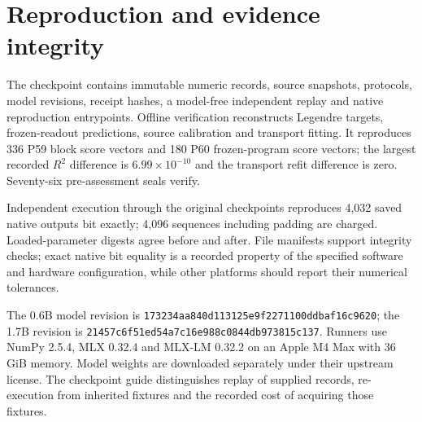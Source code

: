 \documentclass[11pt]{article}
\begin{document}
\section{Reproduction and evidence integrity}
The checkpoint contains immutable numeric records, source snapshots, protocols, model revisions, receipt hashes, a model-free independent replay and native reproduction entrypoints. Offline verification reconstructs Legendre targets, frozen-readout predictions, source calibration and transport fitting. It reproduces 336 P59 block score vectors and 180 P60 frozen-program score vectors; the largest recorded $R^2$ difference is $6.99\times10^{-10}$ and the transport refit difference is zero. Seventy-six pre-assessment seals verify.

Independent execution through the original checkpoints reproduces 4,032 saved native outputs bit exactly; 4,096 sequences including padding are charged. Loaded-parameter digests agree before and after. File manifests support integrity checks; exact native bit equality is a recorded property of the specified software and hardware configuration, while other platforms should report their numerical tolerances.

The 0.6B model revision is \texttt{173234aa840d113125e9f2271100ddbaf16c9620}; the 1.7B revision is \texttt{21457c6f51ed54a7c16e988c0844db973815c137}. Runners use NumPy 2.5.4, MLX 0.32.4 and MLX-LM 0.32.2 on an Apple M4 Max with 36 GiB memory. Model weights are downloaded separately under their upstream license. The checkpoint guide distinguishes replay of supplied records, re-execution from inherited fixtures and the recorded cost of acquiring those fixtures.
\end{document}
